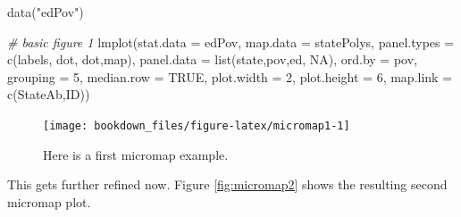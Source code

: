 \documentclass[
]{krantz}
\makeatletter
\newenvironment{Shaded}{\begin{snugshade}}{\end{snugshade}}
\newcommand{\AttributeTok}[1]{\textcolor[rgb]{0.61,0.61,0.61}{#1}}
\newcommand{\CommentTok}[1]{\textcolor[rgb]{0.37,0.37,0.37}{\textit{#1}}}
\newcommand{\ConstantTok}[1]{\textcolor[rgb]{0,0,0}{#1}}
\newcommand{\DecValTok}[1]{\textcolor[rgb]{0.06,0.06,0.06}{#1}}
\newcommand{\FunctionTok}[1]{\textcolor[rgb]{0,0,0}{#1}}
\newcommand{\NormalTok}[1]{#1}
\newcommand{\StringTok}[1]{\textcolor[rgb]{0.5,0.5,0.5}{#1}}
\newenvironment{kframe}{%
\medskip{}
\setlength{\fboxsep}{.8em}
 \def\at@end@of@kframe{}%
 \ifinner\ifhmode%
  \def\at@end@of@kframe{\end{minipage}}%
  \begin{minipage}{\columnwidth}%
 \fi\fi%
 \def\FrameCommand##1{\hskip\@totalleftmargin \hskip-\fboxsep
 \colorbox{shadecolor}{##1}\hskip-\fboxsep
     \hskip-\linewidth \hskip-\@totalleftmargin \hskip\columnwidth}%
 \MakeFramed {\advance\hsize-\width
   \@totalleftmargin\z@ \linewidth\hsize
   \@setminipage}}%
 {\par\unskip\endMakeFramed%
 \at@end@of@kframe}
\renewenvironment{Shaded}{\begin{kframe}}{\end{kframe}}
\makeatother
\begin{document}
\begin{Shaded}
\begin{Highlighting}[]
\FunctionTok{data}\NormalTok{(}\StringTok{"edPov"}\NormalTok{)}

\CommentTok{\# basic figure 1}
\FunctionTok{lmplot}\NormalTok{(}\AttributeTok{stat.data =}\NormalTok{ edPov,}
    \AttributeTok{map.data =}\NormalTok{ statePolys,}
    \AttributeTok{panel.types =} \FunctionTok{c}\NormalTok{(}\StringTok{\textquotesingle{}labels\textquotesingle{}}\NormalTok{, }\StringTok{\textquotesingle{}dot\textquotesingle{}}\NormalTok{, }\StringTok{\textquotesingle{}dot\textquotesingle{}}\NormalTok{,}\StringTok{\textquotesingle{}map\textquotesingle{}}\NormalTok{),}
    \AttributeTok{panel.data =} \FunctionTok{list}\NormalTok{(}\StringTok{\textquotesingle{}state\textquotesingle{}}\NormalTok{,}\StringTok{\textquotesingle{}pov\textquotesingle{}}\NormalTok{,}\StringTok{\textquotesingle{}ed\textquotesingle{}}\NormalTok{, }\ConstantTok{NA}\NormalTok{),}
    \AttributeTok{ord.by =} \StringTok{\textquotesingle{}pov\textquotesingle{}}\NormalTok{,   }
    \AttributeTok{grouping =} \DecValTok{5}\NormalTok{, }\AttributeTok{median.row =} \ConstantTok{TRUE}\NormalTok{,}
    \AttributeTok{plot.width =} \DecValTok{2}\NormalTok{, }\AttributeTok{plot.height =} \DecValTok{6}\NormalTok{,}
    \AttributeTok{map.link =} \FunctionTok{c}\NormalTok{(}\StringTok{\textquotesingle{}StateAb\textquotesingle{}}\NormalTok{,}\StringTok{\textquotesingle{}ID\textquotesingle{}}\NormalTok{))}
\end{Highlighting}
\end{Shaded}

\begin{figure}
\texttt{[image: bookdown\_files/figure-latex/micromap1-1]} \caption{Here is a first micromap example.}\label{fig:micromap1}
\end{figure}

This gets further refined now. Figure \ref{fig:micromap2} shows the resulting second micromap plot.
\end{document}

